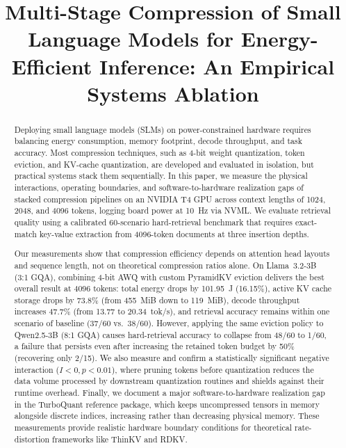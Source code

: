 \documentclass[sigconf,nonacm]{acmart}
\begin{document}
\title{Multi-Stage Compression of Small Language Models for Energy-Efficient Inference: An Empirical Systems Ablation}

\author{\mbox{}}
\renewcommand{\shortauthors}{}

\begin{abstract}
Deploying small language models (SLMs) on power-constrained hardware requires balancing energy consumption, memory footprint, decode throughput, and task accuracy. Most compression techniques, such as 4-bit weight quantization, token eviction, and KV-cache quantization, are developed and evaluated in isolation, but practical systems stack them sequentially. In this paper, we measure the physical interactions, operating boundaries, and software-to-hardware realization gaps of stacked compression pipelines on an NVIDIA T4 GPU across context lengths of 1024, 2048, and 4096 tokens, logging board power at 10~Hz via NVML. We evaluate retrieval quality using a calibrated 60-scenario hard-retrieval benchmark that requires exact-match key-value extraction from 4096-token documents at three insertion depths.

Our measurements show that compression efficiency depends on attention head layouts and sequence length, not on theoretical compression ratios alone. On Llama~3.2-3B (3:1 GQA), combining 4-bit AWQ with custom PyramidKV eviction delivers the best overall result at 4096 tokens: total energy drops by 101.95~J (16.15\%), active KV cache storage drops by 73.8\% (from 455~MiB down to 119~MiB), decode throughput increases 47.7\% (from 13.77 to 20.34~tok/s), and retrieval accuracy remains within one scenario of baseline (37/60 vs.\ 38/60). However, applying the same eviction policy to Qwen2.5-3B (8:1 GQA) causes hard-retrieval accuracy to collapse from 48/60 to 1/60, a failure that persists even after increasing the retained token budget by 50\% (recovering only 2/15). We also measure and confirm a statistically significant negative interaction ($I < 0, p < 0.01$), where pruning tokens before quantization reduces the data volume processed by downstream quantization routines and shields against their runtime overhead. Finally, we document a major software-to-hardware realization gap in the TurboQuant reference package, which keeps uncompressed tensors in memory alongside discrete indices, increasing rather than decreasing physical memory. These measurements provide realistic hardware boundary conditions for theoretical rate-distortion frameworks like ThinKV and RDKV.
\end{abstract}
\end{document}
